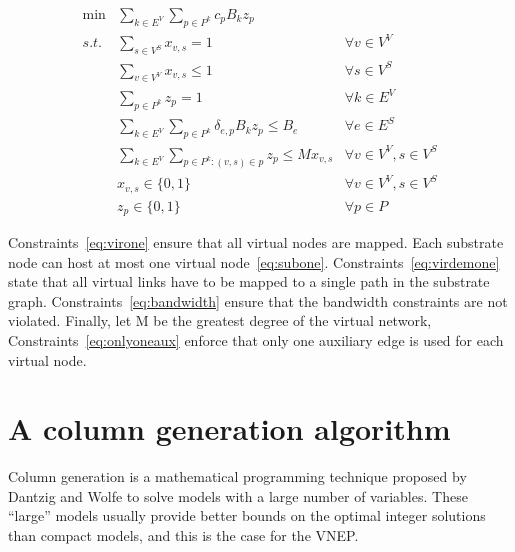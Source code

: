 \documentclass[conference]{IEEEtran}
\begin{document}
\begin{align}
  \min  & \sum\limits_{k \in E^{V}}\sum\limits_{p \in P^k}  c_{p} B_k z_{p}        \nonumber \\
  s.t.  & \sum\limits_{s \in V^{S}} x_{v,s} = 1                                  & \forall v \in V^{V} \label{eq:virone} \\
        & \sum\limits_{v \in V^{V}} x_{v,s} \leq 1                               & \forall s \in V^{S} \label{eq:subone} \\
        & \sum\limits_{p \in P^{k}} z_{p} = 1                                    & \forall k \in E^{V} \label{eq:virdemone} \\
        & \sum\limits_{k \in E^{V}}\sum\limits_{p \in P^{k}} \delta_{e,p} B_{k} z_{p} \leq B_{e} & \forall e \in E^{S} \label{eq:bandwidth} \\
        & \sum\limits_{k \in E^{V}}\sum\limits_{p \in P^k : (v,s) \in p} z_{p} \leq M x_{v,s} & \forall v \in V^{V}, s \in V^{S} \label{eq:onlyoneaux}\\
        &  x_{v,s} \in \{0,1\}  & \forall v \in V^{V}, s \in V^{S} \nonumber \\
        & z_{p} \in \{0,1\}    & \forall p \in {P} \nonumber
\end{align}

Constraints~\eqref{eq:virone} ensure that all virtual nodes are mapped. Each substrate node can host at most one virtual node~\eqref{eq:subone}.
Constraints~\eqref{eq:virdemone} state that all virtual links have to be mapped to a single path in the substrate graph.
Constraints~\eqref{eq:bandwidth} ensure that the bandwidth constraints are not violated.
Finally, let M be the greatest degree of the virtual network, Constraints~\eqref{eq:onlyoneaux} enforce that only one auxiliary edge is used for each virtual node.



\section{A column generation algorithm}
\label{sec:cg}

Column generation is a mathematical programming technique proposed by Dantzig and Wolfe \cite{Dantzig:1960} 
to solve models with a large number of variables.
These ``large'' models usually provide better bounds on the optimal integer solutions than compact models, and this is the case for the VNEP.
\end{document}
